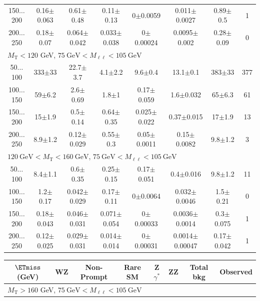 \begin{landscape}
\begin{table}
\begin{center}
\begin{tabular}{| c | c c c c c c c | }
150$\dots$200&0.16$\pm$0.063&0.61$\pm$0.48&0.11$\pm$0.13&0$\pm$0.0059&0.011$\pm$0.0027&0.89$\pm$0.5&1\\
200$\dots$250&0.18$\pm$0.07&0.064$\pm$0.042&0.033$\pm$0.038&0$\pm$0.00024&0.0095$\pm$0.002&0.28$\pm$0.09&0\\
\hline\hline
\multicolumn{8}{l}{$M_{\text{T}} < 120$ GeV, $75~\mathrm{GeV} < M_{\ell\ell} < 105~\mathrm{GeV}$}\\\hline\hline
50$\dots$100&333$\pm$33&22.7$\pm$3.7&4.1$\pm$2.2&9.6$\pm$0.4&13.1$\pm$0.1&383$\pm$33&377\\
100$\dots$150&59$\pm$6.2&2.6$\pm$0.69&1.8$\pm$1&0.17$\pm$0.059&1.6$\pm$0.032&65$\pm$6.3&61\\
150$\dots$200&15$\pm$1.9&0.5$\pm$0.14&0.64$\pm$0.35&0.025$\pm$0.022&0.37$\pm$0.015&17$\pm$1.9&13\\
200$\dots$250&8.9$\pm$1.2&0.12$\pm$0.029&0.55$\pm$0.3&0.05$\pm$0.0011&0.15$\pm$0.0082&9.8$\pm$1.2&3\\
\hline\hline
\multicolumn{8}{l}{$120~\mathrm{GeV} < M_{\text{T}} < 160~\mathrm{GeV}$, $75~\mathrm{GeV} < M_{\ell\ell} < 105~\mathrm{GeV}$}\\\hline\hline
50$\dots$100&8.4$\pm$1.1&0.6$\pm$0.35&0.25$\pm$0.15&0.17$\pm$0.051&0.4$\pm$0.016&9.8$\pm$1.2&11\\
100$\dots$150&1.2$\pm$0.17&0.042$\pm$0.029&0.17$\pm$0.11&0$\pm$0.0064&0.032$\pm$0.0046&1.5$\pm$0.21&0\\
150$\dots$200&0.18$\pm$0.043&0.046$\pm$0.031&0.071$\pm$0.054&0$\pm$0.00033&0.0036$\pm$0.0014&0.3$\pm$0.075&1\\
200$\dots$250&0.12$\pm$0.025&0.029$\pm$0.031&0.014$\pm$0.014&0$\pm$0.00031&0.0014$\pm$0.00047&0.17$\pm$0.042&1\\
\hline\hline
\end{tabular}
\end{center}
\end{table}
\begin{table}
\begin{center}
\begin{tabular}{| c | c c c c c c c | }\hline\hline
$\ETmiss$ (GeV) & WZ & Non-Prompt & Rare SM & Z$\gamma^*$ & ZZ & Total bkg & Observed\\\hline\hline
\multicolumn{8}{l}{$M_{\text{T}} > 160$ GeV, $75~\mathrm{GeV} < M_{\ell\ell} < 105~\mathrm{GeV}$}\\\hline\hline

\end{tabular}
\end{center}
\end{table}
\end{landscape}
